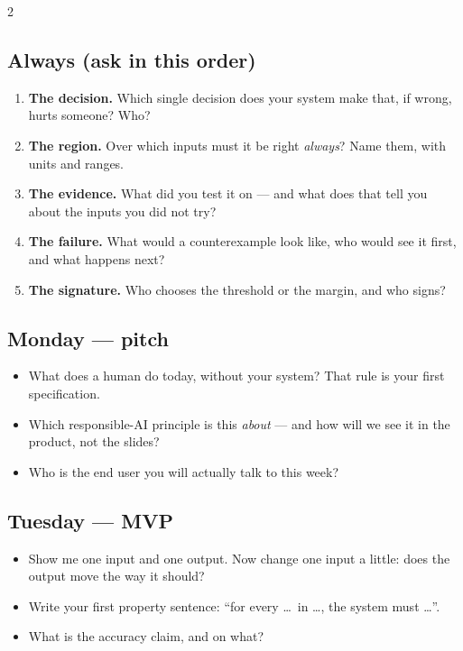 \documentclass[11pt]{article}
\begin{document}
\footnotesize
\begin{multicols}{2}
\subsection*{Always (ask in this order)}
\begin{enumerate}[leftmargin=1.4em,itemsep=2pt]
  \item \textbf{The decision.} Which single decision does your system make that, if wrong, hurts someone? Who?
  \item \textbf{The region.} Over which inputs must it be right \emph{always}? Name them, with units and ranges.
  \item \textbf{The evidence.} What did you test it on — and what does that tell you about the inputs you did not try?
  \item \textbf{The failure.} What would a counterexample look like, who would see it first, and what happens next?
  \item \textbf{The signature.} Who chooses the threshold or the margin, and who signs?
\end{enumerate}

\subsection*{Monday — pitch}
\begin{itemize}
  \item What does a human do today, without your system? That rule is your first specification.
  \item Which responsible-AI principle is this \emph{about} — and how will we see it in the product, not the slides?
  \item Who is the end user you will actually talk to this week?
\end{itemize}

\subsection*{Tuesday — MVP}
\begin{itemize}
  \item Show me one input and one output. Now change one input a little: does the output move the way it should?
  \item Write your first property sentence: ``for every \ldots\ in \ldots, the system must \ldots''.
  \item What is the accuracy claim, and on what?
\end{itemize}


\end{multicols}
\end{document}
